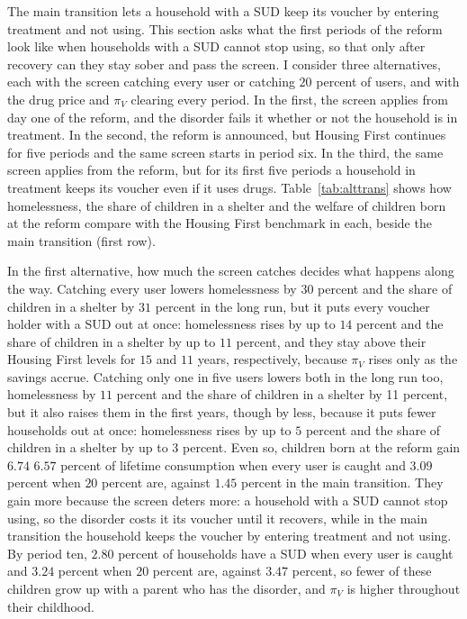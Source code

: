\documentclass[10pt]{article}
\newcommand{\new}[1]{{\color{red}#1}}
\DeclareRobustCommand{\del}[1]{\sout{#1}}
\DeclareRobustCommand{\del}[1]{\sout{#1}}
\begin{document}
The main transition lets a household with a SUD keep its voucher by entering treatment and not using. This section asks what the first periods of the reform look like when households with a SUD cannot stop using, so that only after recovery can they stay sober and pass the screen. I consider three alternatives, each with the screen catching every user or catching $20$ percent of users, and with the drug price and $\pi_V$ clearing every period. In the first, the screen applies from day one of the reform, and the disorder fails it whether or not the household is in treatment. In the second, the reform is announced, but Housing First continues for five periods and the same screen starts in period six. In the third, the same screen applies from the reform, but for its first five periods a household in treatment keeps its voucher even if it uses drugs. Table~\ref{tab:alttrans} shows how homelessness, the share of children in a shelter and the welfare of children born at the reform compare with the Housing First benchmark in each, beside the main transition (first row).




In the first alternative, how much the screen catches decides what happens along the way. Catching every user lowers homelessness by $30$ percent and the share of children in a shelter by $31$ percent in the long run, but it puts every voucher holder with a SUD out at once: homelessness rises by up to $14$ percent and the share of children in a shelter by up to $11$ percent, and they stay above their Housing First levels for $15$ and $11$ years, respectively, because $\pi_V$ rises only as the savings accrue. Catching only one in five users lowers both in the long run too, homelessness by $11$ percent and the share of children in a shelter by 11 percent, but it also raises them in the first years, though by less, because it puts fewer households out at once:  homelessness rises by up to $5$ percent and the share of children in a shelter by up to $3$ percent. Even so, children born at the reform gain \del{$6.74$} \new{$6.57$} percent of lifetime consumption when every user is caught and $3.09$ percent when $20$ percent are, against $1.45$ percent in the main transition. They gain more because the screen deters more: a household with a SUD cannot stop using, so the disorder costs it its voucher until it recovers, while in the main transition the household keeps the voucher by entering treatment and not using. By period ten, $2.80$ percent of households have a SUD when every user is caught and $3.24$ percent when $20$ percent are, against $3.47$ percent, so fewer of these children grow up with a parent who has the disorder, and $\pi_V$ is higher throughout their childhood.
\end{document}
